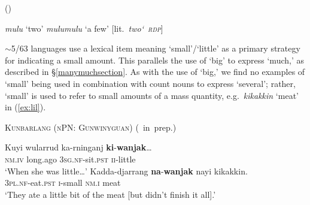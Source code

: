 \documentclass[12pt,egregdoesnotlikesansseriftitles]{scrartcl}
\begin{document}
\begin{exe}
     \hfill (\citealt[87]{patz91}) \label{severalredup1}
  \begin{xlist}
    \ex \textit{mulu} `two'
    \ex \textit{mulumulu} `a few' [lit.\ \textit{two\char`~\textsc{rdp}}]
  \end{xlist}
\end{exe}

$\sim$5/63 languages use a lexical item meaning `small'/`little' as a primary strategy for indicating a small amount. This parallels the use of `big' to express `much,' as described in \S\ref{manymuchsection}. As with the use of `big,' we find no examples of `small' being used in combination with count nouns to express `several'; rather, `small' is used to refer to small amounts of a mass quantity, e.g.\ \textit{kikakkin} `meat' in (\ref{ex:lil}).

\begin{exe}
  \ex\label{ex:lil} \textsc{Kunbarlang (nPN: Gunwinyguan)} \hfill (\citealt{ikthesis}~in~prep.)
  \begin{xlist}
    \ex \gll Kuyi wularrud ka-rninganj \textbf{ki}-\textbf{wanjak}\ldots\\
    \textsc{nm.iv} long.ago \textsc{3sg.nf}-sit.\textsc{pst} \textsc{ii}-little\\
    \glt `When she was little\ldots' %
    \ex \gll Kadda-djarrang \textbf{na}-\textbf{wanjak} nayi kikakkin.\\
    \textsc{3pl.nf}-eat.\textsc{pst} \textsc{i}-small \textsc{nm.i} meat\\
    \glt `They ate a little bit of the meat [but didn't finish it all].' %
  \end{xlist}
\end{exe}
\end{document}
